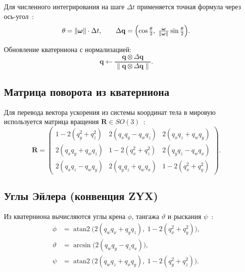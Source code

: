Для численного интегрирования на шаге $\Delta t$ применяется точная формула
через ось-угол~\cite{titterton2004}:
\begin{equation}
    \theta = \|\bm{\omega}\| \cdot \Delta t, \qquad
    \Delta\mathbf{q} = \Bigl(\cos\tfrac{\theta}{2},\;
    \tfrac{\bm{\omega}}{\|\bm{\omega}\|}\sin\tfrac{\theta}{2}\Bigr).
    \label{eq:dq}
\end{equation}
 
Обновление кватерниона с нормализацией:
\begin{equation}
    \mathbf{q} \leftarrow \frac{\mathbf{q} \otimes \Delta\mathbf{q}}
    {\|\mathbf{q} \otimes \Delta\mathbf{q}\|}.
    \label{eq:qupdate}
\end{equation}
 
\subsection{Матрица поворота из кватерниона}
 
Для перевода вектора ускорения из системы координат тела в мировую используется
матрица вращения $\mathbf{R} \in SO(3)$~\cite{kuipers1999}:
\begin{equation}
    \mathbf{R} =
    \begin{pmatrix}
        1{-}2(q_y^2{+}q_z^2) & 2(q_xq_y{-}q_wq_z) & 2(q_xq_z{+}q_wq_y) \\
        2(q_xq_y{+}q_wq_z) & 1{-}2(q_x^2{+}q_z^2) & 2(q_yq_z{-}q_wq_x) \\
        2(q_xq_z{-}q_wq_y) & 2(q_yq_z{+}q_wq_x) & 1{-}2(q_x^2{+}q_y^2)
    \end{pmatrix}.
    \label{eq:rot}
\end{equation}
 
\subsection{Углы Эйлера (конвенция ZYX)}
 
Из кватерниона вычисляются углы крена $\phi$, тангажа $\vartheta$ и рыскания
$\psi$~\cite{titterton2004}:
\begin{align}
    \phi      &= \operatorname{atan2}\!\bigl(2(q_wq_x+q_yq_z),\;
                  1-2(q_x^2+q_y^2)\bigr), \label{eq:roll}\\
    \vartheta &= \arcsin\!\bigl(2(q_wq_y-q_zq_x)\bigr), \label{eq:pitch}\\
    \psi      &= \operatorname{atan2}\!\bigl(2(q_wq_z+q_xq_y),\;
                  1-2(q_y^2+q_z^2)\bigr). \label{eq:yaw}
\end{align}
 
